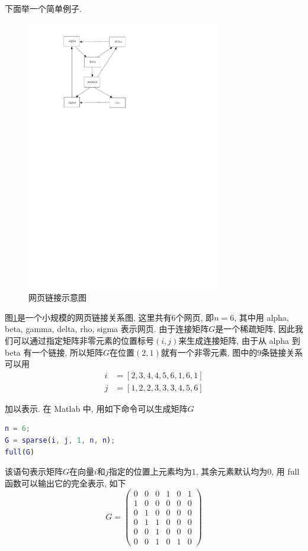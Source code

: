 \documentclass[a4paper,UTF8]{ctexart}
\theoremstyle{plain} \newtheorem{theorem}{定理}[section]
\theoremstyle{plain} \newtheorem{definition}{定义}[section]
\theoremstyle{plain} \newtheorem{lemma}{引理}[section]
\theoremstyle{plain} \newtheorem{proposition}{命题}[section]
\theoremstyle{plain} \newtheorem{example}{例}[section]
\theoremstyle{plain} \newtheorem{remark}{注}[section]
\theoremstyle{plain} \newtheorem{corollary}{推论}[section]
\begin{document}
下面举一个简单例子.
\begin{figure}[!htb]
  \centering
  \includegraphics[width=0.75\textwidth]{net.pdf}
  \caption{网页链接示意图}
  \label{net}
\end{figure}

图\ref{net}是一个小规模的网页链接关系图, 这里共有$6$个网页, 即$n = 6$, 其中用 alpha, beta, gamma, delta, rho, sigma 表示网页. 由于连接矩阵$G$是一个稀疏矩阵, 因此我们可以通过指定矩阵非零元素的位置标号$(i,j)$来生成连接矩阵, 由于从 alpha 到 beta 有一个链接, 所以矩阵$G$在位置$(2,1)$就有一个非零元素, 图中的$9$条链接关系可以用
\begin{align*}
i & = [2, 3, 4, 4, 5, 6, 1, 6, 1] \\ 
j & = [1, 2, 2, 3, 3, 3, 4, 5, 6]
\end{align*}

加以表示. 在 Matlab 中, 用如下命令可以生成矩阵$G$
\begin{lstlisting}[language = matlab]
n = 6;
G = sparse(i, j, 1, n, n);
full(G)
\end{lstlisting}

该语句表示矩阵$G$在向量$i$和$j$指定的位置上元素均为$1$, 其余元素默认均为$0$, 用 full 函数可以输出它的完全表示, 如下
$$
G = 
\begin{pmatrix}
0 & 0 & 0 & 1 & 0 & 1 \\ 
1 & 0 & 0 & 0 & 0 & 0 \\ 
0 & 1 & 0 & 0 & 0 & 0 \\ 
0 & 1 & 1 & 0 & 0 & 0 \\ 
0 & 0 & 1 & 0 & 0 & 0 \\ 
0 & 0 & 1 & 0 & 1 & 0 
\end{pmatrix}
$$
\end{document}
